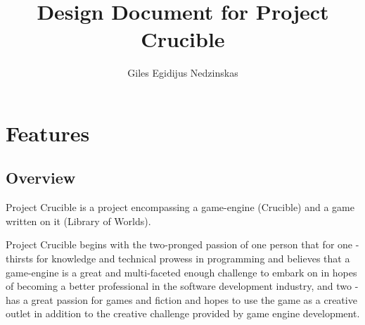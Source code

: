 \documentclass[a4paper,10pt]{book}
\begin{document}
\newcommand{\Projectname}{Project Crucible}
\newcommand{\Enginename}{Crucible}
\newcommand{\Gamename}{Library of Worlds}
\newcommand{\enginenamespace}{cru::}
\newcommand{\admonition}[3][white]{
  \begin{table*}[h]
  \colorbox{#1}{
  \begin{tabular}{l | l}
    {#2} &
    \begin{minipage}{\linewidth - \evensidemargin - \tabcolsep}
      {#3}
    \end{minipage}
  \end{tabular}
  }
  \end{table*}
}
\newcommand{\TODO}[1]{
  \admonition[red!10]{\textcolor{red}{TODO}}{\textcolor{red}{#1}}
}
\newcommand{\danger}[1]{
  \admonition[red!10]{\textcolor{red}{DNGR}}{#1}
}
\newcommand{\note}[1]{\admonition[blue!10]{NOTE}{#1}}
\newcommand{\think}[1]{\admonition[orange!15]{THNK}{\textcolor{orange}{#1}}}
\newcommand{\textbi}[1]{\textbf{\textit{#1}}}
\newcommand{\codew}[1]{\mbox{\texttt{#1}}}

\author{Giles Egidijus Nedzinskas}
\title{Design Document for \Projectname{}}
\maketitle{}

\tableofcontents

\part{Features}

\chapter{Overview}
\Projectname{} is a project encompassing a game-engine (\Enginename{}) and a game written on it (\Gamename{}).

\Projectname{} begins with the two-pronged passion of one person that for one - thirsts for knowledge and technical prowess in programming and believes that a game-engine is a great and multi-faceted enough challenge to embark on in hopes of becoming a better professional in the software development industry, and two - has a great passion for games and fiction and hopes to use the game as a creative outlet in addition to the creative challenge provided by game engine development.
\end{document}
